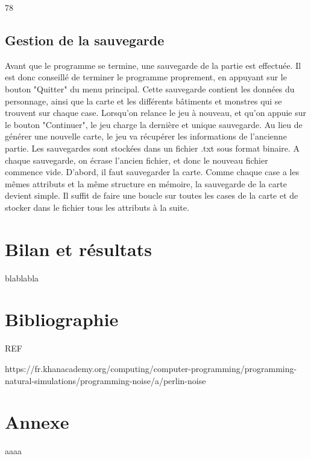 \documentclass[11pt,a4paper]{article}
\begin{document}
78

\subsection{Gestion de la sauvegarde}

Avant que le programme se termine, une sauvegarde de la partie est effectuée.
Il est donc conseillé de terminer le programme proprement, en appuyant sur le bouton "Quitter" du menu principal.
Cette sauvegarde contient les données du personnage, ainsi que la carte et les différents bâtiments et monstres qui se trouvent sur chaque case.
Lorsqu'on relance le jeu à nouveau, et qu'on appuie sur le bouton "Continuer", le jeu charge la dernière et unique sauvegarde.
Au lieu de générer une nouvelle carte, le jeu va récupérer les informations de l'ancienne partie.
Les sauvegardes sont stockées dans un fichier .txt sous format binaire.
A chaque sauvegarde, on écrase l'ancien fichier, et donc le nouveau fichier commence vide.
D'abord, il faut sauvegarder la carte.
Comme chaque case a les mêmes attributs et la même structure en mémoire, la sauvegarde de la carte devient simple.
Il suffit de faire une boucle sur toutes les cases de la carte et de stocker dans le fichier tous les attributs à la suite.

\section{Bilan et résultats}

blablabla

\section{Bibliographie}

\begin{thebibliography}{REF}

	 https://fr.khanacademy.org/computing/computer-programming/programming-natural-simulations/programming-noise/a/perlin-noise

\end{thebibliography}

\newpage

\section{Annexe}

aaaa
\end{document}
